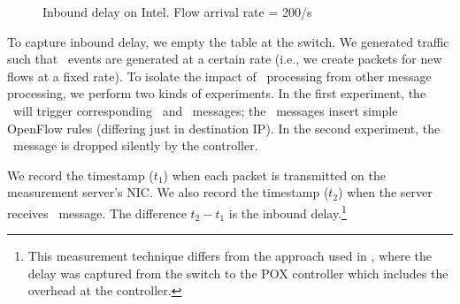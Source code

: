 \begin{figure}
{}
\caption{Inbound delay on Intel. Flow arrival rate = 200/s} 
\label{fig:inbound-1}
\end{figure}

To capture inbound delay, we empty the table at the switch. We
generated traffic such that \packetin\ events are generated at a
certain rate (i.e., we create packets for new flows at a fixed
rate). To isolate the impact of \packetin\ processing from other
message processing, we perform two kinds of experiments.
In the first experiment, the \packetin\ will trigger corresponding
\flowmod\ and \packetout\ messages; the \flowmod\ messages insert
simple OpenFlow rules (differing just in destination IP).
In the second experiment, the \packetin\ message is dropped silently by the controller. 

We record the timestamp ($t_1$) when each packet is transmitted on the
measurement server's NIC. We also record the timestamp ($t_2$) when the server
receives \packetin\ message. The difference $t_2 - t_1$ is the inbound
delay.\footnote{This measurement technique differs from the approach
  used in \cite{ucsdpaper}, where the delay was captured from the
  switch to the POX controller which includes the overhead at the
  controller.}

